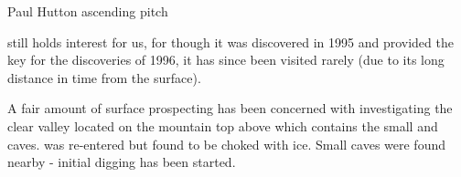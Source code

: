 \begin{marginfigure}
\checkoddpage \ifoddpage \forcerectofloat \else \forceversofloat \fi
\centering
 \caption{Paul Hutton ascending \protect{} pitch  }
 \label{paul plopzilla}
\end{marginfigure}


 still holds interest for us, for though it was discovered in 1995
and provided the key for the discoveries of 1996, it has since been
visited rarely (due to its long distance in time from the surface).

A fair amount of surface prospecting has been concerned with investigating
the clear valley located on the mountain top above which contains the
small  and  caves.  was re-entered but found to be choked with
ice. Small caves were found nearby - initial digging has been started.